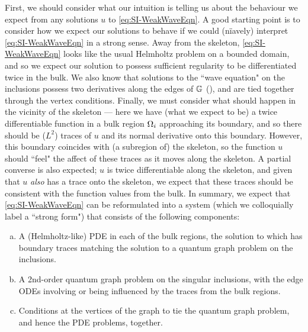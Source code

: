 First, we should consider what our intuition is telling us about the behaviour we expect from any solutions $u$ to \eqref{eq:SI-WeakWaveEqn}.
A good starting point is to consider how we expect our solutions to behave if we could (n\"{i}avely) interpret \eqref{eq:SI-WeakWaveEqn} in a strong sense.
Away from the skeleton, \eqref{eq:SI-WeakWaveEqn} looks like the usual Helmholtz problem on a bounded domain, and so we expect our solution to possess sufficient regularity to be differentiated twice in the bulk.
We also know that solutions to the ``wave equation" on the inclusions possess two derivatives along the edges of $\mathbb{G}$ (), and are tied together through the vertex conditions.
Finally, we must consider what should happen in the vicinity of the skeleton --- here we have (what we expect to be) a twice differentiable function in a bulk region $\Omega_i$ approaching its boundary, and so there should be ($L^2$) traces of $u$ and its normal derivative onto this boundary.
However, this boundary coincides with (a subregion of) the skeleton, so the function $u$ should ``feel" the affect of these traces as it moves along the skeleton.
A partial converse is also expected; $u$ is twice differentiable along the skeleton, and given that $u$ \emph{also} has a trace onto the skeleton, we expect that these traces should be consistent with the function values from the bulk.
In summary, we expect that \eqref{eq:SI-WeakWaveEqn} can be reformulated into a system (which we colloquially label a ``strong form") that consists of the following components:
\begin{enumerate}[(a)]
	\item A (Helmholtz-like) PDE in each of the bulk regions, the solution to which has boundary traces matching the solution to a quantum graph problem on the inclusions.
	\item A 2nd-order quantum graph problem on the singular inclusions, with the edge ODEs involving or being influenced by the traces from the bulk regions.
	\item Conditions at the vertices of the graph to tie the quantum graph problem, and hence the PDE problems, together.
\end{enumerate}

